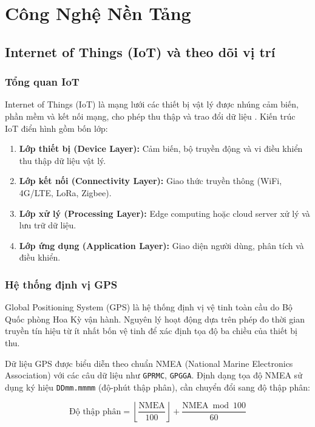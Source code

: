 \chapter{Công Nghệ Nền Tảng}

\section{Internet of Things (IoT) và theo dõi vị trí}

\subsection{Tổng quan IoT}

Internet of Things (IoT) là mạng lưới các thiết bị vật lý được nhúng cảm biến, phần mềm và kết nối mạng, cho phép thu thập và trao đổi dữ liệu \cite{atzori2010iot}. Kiến trúc IoT điển hình gồm bốn lớp:

\begin{enumerate}
  \item \textbf{Lớp thiết bị (Device Layer):} Cảm biến, bộ truyền động và vi điều khiển thu thập dữ liệu vật lý.
  \item \textbf{Lớp kết nối (Connectivity Layer):} Giao thức truyền thông (WiFi, 4G/LTE, LoRa, Zigbee).
  \item \textbf{Lớp xử lý (Processing Layer):} Edge computing hoặc cloud server xử lý và lưu trữ dữ liệu.
  \item \textbf{Lớp ứng dụng (Application Layer):} Giao diện người dùng, phân tích và điều khiển.
\end{enumerate}

\subsection{Hệ thống định vị GPS}

Global Positioning System (GPS) là hệ thống định vị vệ tinh toàn cầu do Bộ Quốc phòng Hoa Kỳ vận hành. Nguyên lý hoạt động dựa trên phép đo thời gian truyền tín hiệu từ ít nhất bốn vệ tinh để xác định tọa độ ba chiều của thiết bị thu.

Dữ liệu GPS được biểu diễn theo chuẩn NMEA (National Marine Electronics Association) với các câu dữ liệu như \texttt{GPRMC}, \texttt{GPGGA}. Định dạng tọa độ NMEA sử dụng ký hiệu \texttt{DDmm.mmmm} (độ-phút thập phân), cần chuyển đổi sang độ thập phân:

\begin{equation}
  \text{Độ thập phân} = \left\lfloor \frac{\text{NMEA}}{100} \right\rfloor + \frac{\text{NMEA} \bmod 100}{60}
  \label{eq:nmea_convert}
\end{equation}

